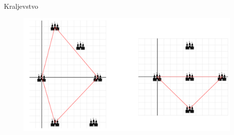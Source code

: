 \begin{statement}[
  problempoints=100,
  timelimit=1 sekunda,
  memorylimit=512 MiB,
]{Kraljevstvo}
\begin{figure}[H]
\centering
\includegraphics[width=\textwidth]{img/dummy_skice.png}
\end{figure}


\end{statement}

